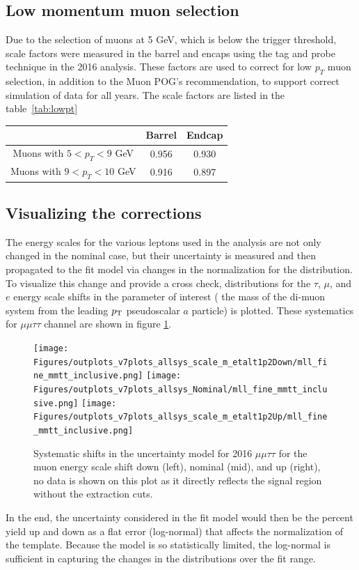 \subsection{Low momentum muon selection}
Due to the selection of muons at 5 GeV, which is below the trigger threshold, scale factors were measured in the barrel and encaps using the tag and probe technique in the 2016 analysis. These factors are used to correct for low $p_T$ muon selection, in addition to the Muon POG's recommendation, to support correct simulation of data for all years. The scale factors are listed in the table~\ref{tab:lowpt}
\begin{table}[h!tbp]
\centering
{}
\begin{tabular*}{0.6\textwidth}{c|c|c}
   & Barrel & Endcap \\\hline
Muons with $5 < p_T < 9$ GeV & 0.956 & 0.930\\\hline
Muons with $9 < p_T < 10$ GeV & 0.916 & 0.897\\\hline 
\end{tabular*}
\end{table}


\subsection{Visualizing the corrections}

The energy scales for the various leptons used in the analysis are not only changed in the nominal case, but their uncertainty is measured and then propagated to the fit model via changes in the normalization for the distribution. To visualize this change and provide a cross check, distributions for the $\tau$, $\mu$, and $e$ energy scale shifts in the parameter of interest ( the mass of the di-muon system from the leading $p_{\mathrm{T}}$ pseudoscalar $a$ particle) is plotted. 
These systematics for $\mu\mu\tau\tau$ channel are shown in figure \ref{fig:sys_shift_mmtt2016}.
\begin{figure}[ht!b]
\label{fig:sys_shift_mmtt2016}
  \centering
\texttt{[image: Figures/outplots\_v7plots\_allsys\_scale\_m\_etalt1p2Down/mll\_fine\_mmtt\_inclusive.png]} 
\texttt{[image: Figures/outplots\_v7plots\_allsys\_Nominal/mll\_fine\_mmtt\_inclusive.png]}
\texttt{[image: Figures/outplots\_v7plots\_allsys\_scale\_m\_etalt1p2Up/mll\_fine\_mmtt\_inclusive.png]} \\

    \caption{Systematic shifts in the uncertainty model for 2016 $\mu\mu\tau\tau$ for the muon energy scale shift down (left), nominal (mid), and up (right), no data is shown on this plot as it directly reflects the signal region without the extraction cuts.}
\end{figure}

In the end, the uncertainty considered in the fit model would then be the percent yield up and down as a flat error (log-normal) that affects the normalization of the template. Because the model is so statistically limited, the log-normal is sufficient in capturing the changes in the distributions over the fit range.  
